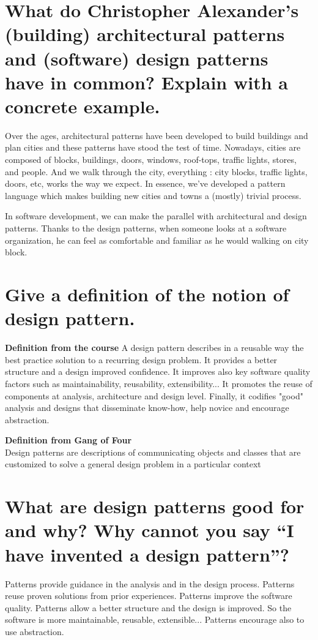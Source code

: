 \section{What do Christopher Alexander’s (building) architectural patterns and (software) design patterns have in common? Explain with a concrete example.}

Over the ages, architectural patterns have been developed to build buildings and plan cities and these patterns have stood the test of time.
Nowadays, cities are composed of  blocks, buildings, doors, windows, roof-tops, traffic lights, stores, and people. And we walk through the city, everything : city blocks, traffic lights, doors, etc, works the way we expect. In essence, we’ve developed a pattern language which makes building new cities and towns a (mostly) trivial process. 

In software development, we can make the parallel with architectural and design patterns. Thanks to the design patterns, when someone looks at a software organization, he can feel as comfortable and familiar as he would walking on city block.

\section{Give a definition of the notion of design pattern.}

\textbf{Definition from the course}
A design pattern describes in a reusable way the best practice solution to a recurring design problem. It provides a better structure and a design improved confidence. It improves also key software quality factors such as maintainability, reusability, extensibility... It promotes the reuse of components at analysis, architecture and design level. Finally, it codifies "good" analysis and designs that disseminate know-how, help novice and encourage abstraction.

\textbf{Definition from Gang of Four} \\
Design patterns are descriptions of communicating objects and classes that are customized to solve a general design problem in a particular context

\section{What are design patterns good for and why?
Why cannot you say “I have invented a design pattern”?}

Patterns provide guidance in the analysis and in the design process. Patterns reuse proven solutions from prior experiences. Patterns improve the software quality. Patterns allow a better structure and the design is improved. So the software is more maintainable, reusable, extensible... Patterns encourage also to use abstraction.

